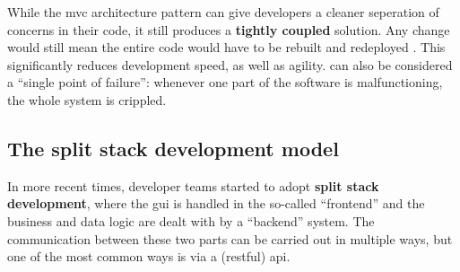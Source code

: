 While the \gls{mvc} architecture pattern can give developers a cleaner
seperation of concerns in their code, it still produces a \textbf{tightly
coupled} solution. Any change would still mean the entire code would have to be
rebuilt and redeployed \autocite{Fowler_Microservices_2014}. This significantly
reduces development speed, as well as agility.  can also be considered
a  ``single point of failure'': whenever one part of the software is
malfunctioning, the whole system is crippled.


\subsection{The split stack development model}
\label{ssec:split-stack}


In more recent times, developer teams started to adopt \textbf{split stack
development}, where the \gls{gui} is handled in the so-called ``\gls{frontend}'' and
the business and data logic are dealt with by a ``\gls{backend}'' system. The
communication between these two parts can be carried out in multiple ways, but
one of the most common ways is via a (\gls{restful}) \gls{api}.

